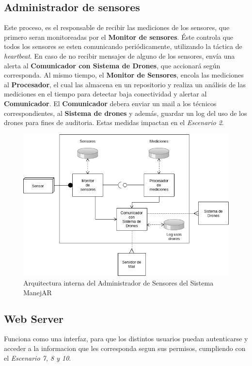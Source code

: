 \subsection{Administrador de sensores}
Este proceso, es el responsable de recibir las mediciones de los sensores, que 
primero seran monitoreadas por el \textbf{Monitor de sensores}. Éste controla que todos
los sensores se esten comunicando periódicamente, utilizando la táctica de
\textit{heartbeat}. En caso de no recibir mensajes de alguno de los sensores, envía una
alerta al \textbf{Comunicador con Sistema de Drones}, que accionará según corresponda.
Al mismo tiempo, el \textbf{Monitor de Sensores}, encola las mediciones al \textbf{Procesador}, el
cual las almacena en un repositorio y realiza un análisis de las mediciones en
el tiempo para detectar baja conectividad y alertar al \textbf{Comunicador}.
El \textbf{Comunicador} debera enviar un mail a los técnicos correspondientes, al \textbf{Sistema 
de drones} y además, guardar un log del uso de los drones para fines de auditoria.
Estas medidas impactan en el \textit{Escenario 2}.


\begin{figure}
\centerline{\includegraphics[width=1\textwidth]{./imagenes/arquitectura_tp2/administrador_sensores.png}}
\caption{Arquitectura interna del Administrador de Sensores del Sistema ManejAR}
\end{figure}


\subsection{Web Server}
Funciona como una interfaz, para que los distintos usuarios puedan autenticarse 
y acceder a la informacion que les corresponda segun sus permisos, cumpliendo 
con el \textit{Escenario 7, 8 y 10}.



